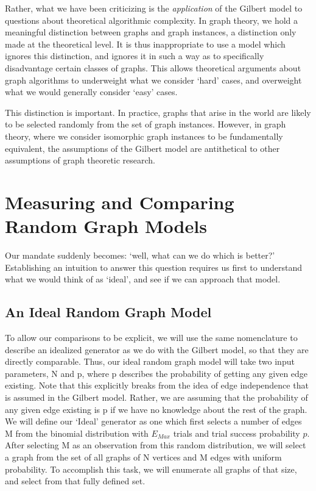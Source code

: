 Rather, what we have been criticizing is the \emph{application} of the Gilbert model to questions about theoretical algorithmic complexity.
In graph theory, we hold a meaningful distinction between graphs and graph instances, a distinction only made at the theoretical level.
It is thus inappropriate to use a model which ignores this distinction, and ignores it in such a way as to specifically disadvantage certain classes of graphs.
This allows theoretical arguments about graph algorithms to underweight what we consider `hard' cases, and overweight what we would generally consider `easy' cases.

This distinction is important.
In practice, graphs that arise in the world are likely to be selected randomly from the set of graph instances.
However, in graph theory, where we consider isomorphic graph instances to be fundamentally equivalent, the assumptions of the Gilbert model are antithetical to other assumptions of graph theoretic research.

\section{Measuring and Comparing Random Graph Models}

Our mandate suddenly becomes: `well, what can we do which is better?'
Establishing an intuition to answer this question requires us first to understand what we would think of as `ideal', and see if we can approach that model.

\subsection{An Ideal Random Graph Model}
To allow our comparisons to be explicit, we will use the same nomenclature to describe an idealized generator as we do with the Gilbert model, so that they are directly comparable.
Thus, our ideal random graph model will take two input parameters, N and p, where p describes the probability of getting any given edge existing.
Note that this explicitly breaks from the idea of edge independence that is assumed in the Gilbert model.
Rather, we are assuming that the probability of any given edge existing is p if we have no knowledge about the rest of the graph.
We will define our `Ideal' generator as one which first selects a number of edges M from the binomial distribution with $E_{Max}$ trials and trial success probability $p$.
After selecting M as an observation from this random distribution, we will select a graph from the set of all graphs of N vertices and M edges with uniform probability.
To accomplish this task, we will enumerate all graphs of that size, and select from that fully defined set.


